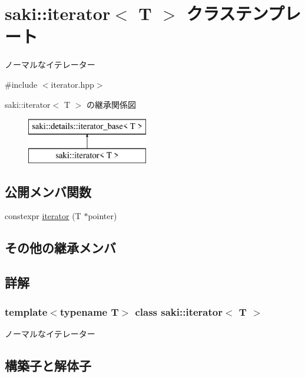 \hypertarget{classsaki_1_1iterator}{}\section{saki\+:\+:iterator$<$ T $>$ クラステンプレート}
\label{classsaki_1_1iterator}


ノーマルなイテレーター  




{\ttfamily \#include $<$iterator.\+hpp$>$}

saki\+:\+:iterator$<$ T $>$ の継承関係図\begin{figure}[H]
\begin{center}
\leavevmode
\includegraphics[height=2.000000cm]{classsaki_1_1iterator}
\end{center}
\end{figure}
\subsection*{公開メンバ関数}
\begin{DoxyCompactItemize}
\item 
constexpr \mbox{\hyperlink{classsaki_1_1iterator_aaf66a5b986033d29630294dd2646bec3}{iterator}} (T $\ast$pointer)
\end{DoxyCompactItemize}
\subsection*{その他の継承メンバ}


\subsection{詳解}
\subsubsection*{template$<$typename T$>$\newline
class saki\+::iterator$<$ T $>$}

ノーマルなイテレーター 

\subsection{構築子と解体子}
\mbox{\label{classsaki_1_1iterator_aaf66a5b986033d29630294dd2646bec3}} 
